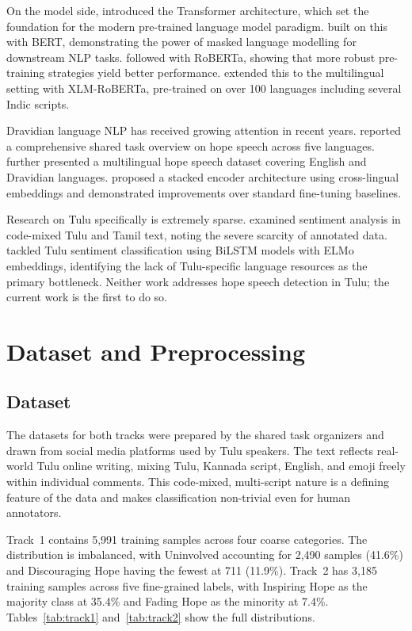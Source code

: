 \documentclass[11pt]{article}
\begin{document}
On the model side,  introduced the Transformer architecture,
which set the foundation for the modern pre-trained language model paradigm.
 built on this with BERT, demonstrating the power of masked
language modelling for downstream NLP tasks.  followed with RoBERTa,
showing that more robust pre-training strategies yield better performance.
 extended this to the multilingual setting with XLM-RoBERTa,
pre-trained on over 100 languages including several Indic scripts.

Dravidian language NLP has received growing attention in recent years.
 reported a comprehensive shared task overview on
hope speech across five languages.  further
presented a multilingual hope speech dataset covering English and Dravidian languages.
 proposed a stacked encoder architecture using cross-lingual
embeddings and demonstrated improvements over standard fine-tuning baselines.

Research on Tulu specifically is extremely sparse.  examined
sentiment analysis in code-mixed Tulu and Tamil text, noting the severe scarcity of
annotated data.  tackled Tulu sentiment classification using BiLSTM
models with ELMo embeddings, identifying the lack of Tulu-specific language resources
as the primary bottleneck. Neither work addresses hope speech detection in Tulu;
the current work is the first to do so.

\section{Dataset and Preprocessing}

\subsection{Dataset}
The datasets for both tracks were prepared by the shared task organizers and drawn
from social media platforms used by Tulu speakers. The text reflects real-world Tulu
online writing, mixing Tulu, Kannada script, English, and emoji freely within
individual comments. This code-mixed, multi-script nature is a defining feature of
the data and makes classification non-trivial even for human annotators.

Track~1 contains 5,991 training samples across four coarse categories. The
distribution is imbalanced, with Uninvolved accounting for 2,490 samples (41.6\%)
and Discouraging Hope having the fewest at 711 (11.9\%). Track~2 has 3,185 training
samples across five fine-grained labels, with Inspiring Hope as the majority class
at 35.4\% and Fading Hope as the minority at 7.4\%.
Tables~\ref{tab:track1} and~\ref{tab:track2} show the full distributions.
\end{document}
